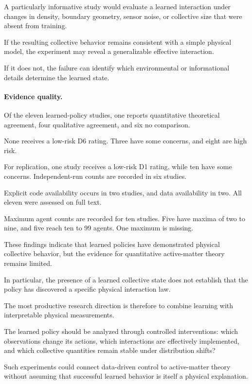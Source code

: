 A particularly
informative study
would evaluate
a learned interaction
under changes
in density,
boundary geometry,
sensor noise,
or collective size
that were absent
from training.

If the resulting
collective behavior
remains consistent
with a simple
physical model,
the experiment
may reveal a
generalizable
effective interaction.

If it does not,
the failure can
identify which
environmental
or informational
details determine
the learned state.

\paragraph*{Evidence quality.}

Of the eleven learned-policy
studies, one reports
quantitative theoretical
agreement, four qualitative
agreement, and six
no comparison.

None receives a
low-risk D6 rating.
Three have some concerns,
and eight are high risk.

For replication, one
study receives a
low-risk D1 rating,
while ten have
some concerns.
Independent-run counts
are recorded in six
studies.

Explicit code availability
occurs in two studies,
and data availability
in two.
All eleven were
assessed on full text.

Maximum agent counts
are recorded for ten
studies. Five have
maxima of two to nine,
and five reach
ten to 99 agents.
One maximum is missing.

These findings indicate
that learned policies
have demonstrated
physical collective
behavior, but the
evidence for quantitative
active-matter theory
remains limited.

In particular,
the presence of
a learned collective
state does not
establish that
the policy has
discovered a
specific physical
interaction law.

The most productive
research direction
is therefore to
combine learning
with interpretable
physical measurements.

The learned policy
should be analyzed
through controlled
interventions:
which observations
change its actions,
which interactions
are effectively
implemented, and
which collective
quantities remain
stable under
distribution shifts?

Such experiments
could connect
data-driven control
to active-matter
theory without
assuming that
successful learned
behavior is itself
a physical
explanation.

